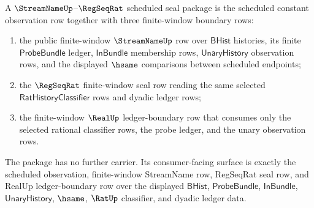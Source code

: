 \begin{definition}
\label{def:streamname-regseqrat-scheduled-seal-package}
A $\StreamNameUp$--$\RegSeqRat$ scheduled seal package is the scheduled
constant observation row together with three finite-window boundary rows:
\begin{enumerate}
  \item the public finite-window $\StreamNameUp$ row over
  $\mathsf{BHist}$ histories, its finite $\mathsf{ProbeBundle}$ ledger,
  $\mathsf{InBundle}$ membership rows, $\mathsf{UnaryHistory}$ observation
  rows, and the displayed $\hsame$ comparisons between scheduled endpoints;
  \item the $\RegSeqRat$ finite-window seal row reading the same selected
  $\mathsf{RatHistoryClassifier}$ rows and dyadic ledger rows;
  \item the finite-window $\RealUp$ ledger-boundary row that consumes only the
  selected rational classifier rows, the probe ledger, and the unary
  observation rows.
\end{enumerate}
The package has no further carrier. Its consumer-facing surface is exactly the
scheduled observation, finite-window StreamName row, RegSeqRat seal row, and
RealUp ledger-boundary row over the displayed $\mathsf{BHist}$,
$\mathsf{ProbeBundle}$, $\mathsf{InBundle}$, $\mathsf{UnaryHistory}$,
$\hsame$, $\RatUp$ classifier, and dyadic ledger data.
\end{definition}

